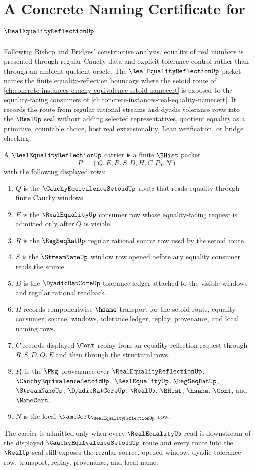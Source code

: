 \chapter{A Concrete Naming Certificate for $\RealEqualityReflectionUp$}
\label{ch:concrete-instances-real-equality-reflection-namecert}

Following Bishop and Bridges' constructive analysis, equality of real numbers is presented through regular Cauchy data and explicit tolerance control rather than through an ambient quotient oracle. The $\RealEqualityReflectionUp$ packet names the finite equality-reflection boundary where the setoid route of \autoref{ch:concrete-instances-cauchy-equivalence-setoid-namecert} is exposed to the equality-facing consumers of \autoref{ch:concrete-instances-real-equality-namecert}. It records the route from regular rational streams and dyadic tolerance rows into the $\RealUp$ seal without adding selected representatives, quotient equality as a primitive, countable choice, host real extensionality, Lean verification, or bridge checking.

\begin{definition}
\label{def:real-equality-reflection-carrier}
A $\RealEqualityReflectionUp$ carrier is a finite $\BHist$ packet
$$
P=(Q,E,R,S,D,H,C,P_0,N)
$$
with the following displayed rows:
\begin{enumerate}
\item $Q$ is the $\CauchyEquivalenceSetoidUp$ route that reads equality through finite Cauchy windows.
\item $E$ is the $\RealEqualityUp$ consumer row whose equality-facing request is admitted only after $Q$ is visible.
\item $R$ is the $\RegSeqRatUp$ regular rational source row used by the setoid route.
\item $S$ is the $\StreamNameUp$ window row opened before any equality consumer reads the source.
\item $D$ is the $\DyadicRatCoreUp$ tolerance ledger attached to the visible windows and regular rational readback.
\item $H$ records componentwise $\hsame$ transport for the setoid route, equality consumer, source, windows, tolerance ledger, replay, provenance, and local naming rows.
\item $C$ records displayed $\Cont$ replay from an equality-reflection request through $R,S,D,Q,E$ and then through the structural rows.
\item $P_0$ is the $\Pkg$ provenance over $\RealEqualityReflectionUp$, $\CauchyEquivalenceSetoidUp$, $\RealEqualityUp$, $\RegSeqRatUp$, $\StreamNameUp$, $\DyadicRatCoreUp$, $\RealUp$, $\BHist$, $\hsame$, $\Cont$, and $\NameCert$.
\item $N$ is the local $\NameCert_{\RealEqualityReflectionUp}$ row.
\end{enumerate}
The carrier is admitted only when every $\RealEqualityUp$ read is downstream of the displayed $\CauchyEquivalenceSetoidUp$ route and every route into the $\RealUp$ seal still exposes the regular source, opened window, dyadic tolerance row, transport, replay, provenance, and local name.
\end{definition}

